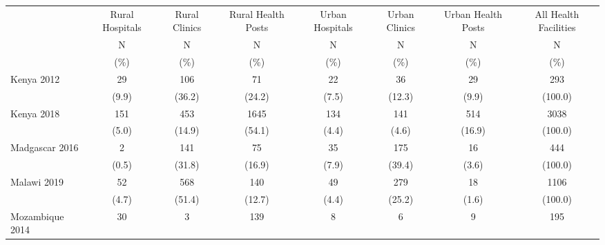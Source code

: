 \def\sym#1{\ifmmode^{#1}\else\(^{#1}\)\fi}
\begin{tabular}{l*{7}{c}}
\hline\hline
         &\multicolumn{1}{c}{Rural Hospitals}&\multicolumn{1}{c}{Rural Clinics}&\multicolumn{1}{c}{Rural Health Posts}&\multicolumn{1}{c}{Urban Hospitals}&\multicolumn{1}{c}{Urban Clinics}&\multicolumn{1}{c}{Urban Health Posts}&\multicolumn{1}{c}{All Health Facilities}\\
         &                                     N&              N&                              N&              N&                      N&              N&       N\\
         &                                     (\%)&           (\%)&                           (\%)&           (\%)&           (\%)&           (\%)&    (\%)\\
\hline
Kenya 2012&                            {29}&                {106}&          {71}&                    {22}&               {36}&               {29}&       {293}\\
&                                              {(9.9)}&      {(36.2)}&        {(24.2)}&                  {(7.5)}&     {(12.3)}&     {(9.9)}&         {(100.0)}\\
Kenya 2018&                    {151}&                {453}&          {1645}&                    {134}&       {141}&               {514}&               {3038}\\
&                                              {(5.0)}&      {(14.9)}&        {(54.1)}&                  {(4.4)}&     {(4.6)}&     {(16.9)}&             {(100.0)}\\
Madgascar 2016&                {2}&                {141}&          {75}&                    {35}&       {175}&               {16}&               {444}\\
&                                              {(0.5)}&      {(31.8)}&        {(16.9)}&                  {(7.9)}&     {(39.4)}&     {(3.6)}&             {(100.0)}\\
Malawi 2019&                   {52}&                {568}&          {140}&                    {49}&       {279}&               {18}&               {1106}\\
&                                              {(4.7)}&      {(51.4)}&        {(12.7)}&                  {(4.4)}&     {(25.2)}&     {(1.6)}&             {(100.0)}\\
Mozambique 2014&               {30}&                {3}&          {139}&                    {8}&       {6}&               {9}&               {195}\\

\end{tabular}

